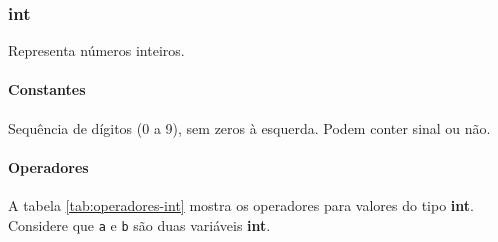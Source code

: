 \subsubsection{int}
Representa números inteiros.

\paragraph{Constantes} Sequência de dígitos (0 a 9), sem zeros à esquerda. Podem conter sinal ou não.

\paragraph{Operadores} A tabela \ref{tab:operadores-int} mostra os operadores para valores do tipo \textbf{int}. Considere que \texttt{a} e \texttt{b} são duas variáveis \textbf{int}.
